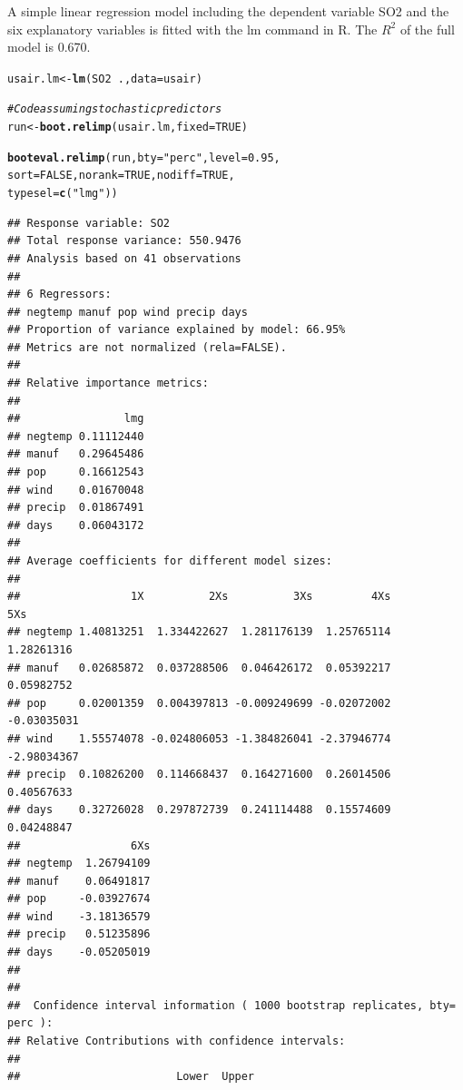 \documentclass[11pt,a4paper,twoside]{book}
\makeatletter
\newcommand{\hlnum}[1]{\textcolor[rgb]{0.686,0.059,0.569}{#1}}%
\newcommand{\hlstr}[1]{\textcolor[rgb]{0.192,0.494,0.8}{#1}}%
\newcommand{\hlcom}[1]{\textcolor[rgb]{0.678,0.584,0.686}{\textit{#1}}}%
\newcommand{\hlopt}[1]{\textcolor[rgb]{0,0,0}{#1}}%
\newcommand{\hlstd}[1]{\textcolor[rgb]{0.345,0.345,0.345}{#1}}%
\newcommand{\hlkwb}[1]{\textcolor[rgb]{0.69,0.353,0.396}{#1}}%
\newcommand{\hlkwc}[1]{\textcolor[rgb]{0.333,0.667,0.333}{#1}}%
\newcommand{\hlkwd}[1]{\textcolor[rgb]{0.737,0.353,0.396}{\textbf{#1}}}%
\newenvironment{kframe}{%
 \def\at@end@of@kframe{}%
 \ifinner\ifhmode%
  \def\at@end@of@kframe{\end{minipage}}%
  \begin{minipage}{\columnwidth}%
 \fi\fi%
 \def\FrameCommand##1{\hskip\@totalleftmargin \hskip-\fboxsep
 \colorbox{shadecolor}{##1}\hskip-\fboxsep
     \hskip-\linewidth \hskip-\@totalleftmargin \hskip\columnwidth}%
 \MakeFramed {\advance\hsize-\width
   \@totalleftmargin\z@ \linewidth\hsize
   \@setminipage}}%
 {\par\unskip\endMakeFramed%
 \at@end@of@kframe}
\newenvironment{knitrout}{}{} %
\makeatother
\begin{document}
A simple linear regression model including the dependent variable SO2 and the six explanatory variables is fitted with the lm command in R. The $R^2$ of the full model is 0.670. 

\begin{knitrout}
\color{fgcolor}\begin{kframe}
\begin{alltt}
\hlstd{usair.lm} \hlkwb{<-} \hlkwd{lm}\hlstd{(SO2}\hlopt{~}\hlstd{.,} \hlkwc{data} \hlstd{= usair)}


\hlcom{#Code assuming stochastic predictors}
\hlstd{run}\hlkwb{<-}\hlkwd{boot.relimp}\hlstd{(usair.lm,} \hlkwc{fixed}\hlstd{=}\hlnum{TRUE}\hlstd{)}

\hlkwd{booteval.relimp}\hlstd{(run,} \hlkwc{bty} \hlstd{=} \hlstr{"perc"}\hlstd{,} \hlkwc{level} \hlstd{=} \hlnum{0.95}\hlstd{,}
                \hlkwc{sort} \hlstd{=} \hlnum{FALSE}\hlstd{,} \hlkwc{norank} \hlstd{=} \hlnum{TRUE}\hlstd{,} \hlkwc{nodiff} \hlstd{=} \hlnum{TRUE}\hlstd{,}
                \hlkwc{typesel} \hlstd{=} \hlkwd{c}\hlstd{(}\hlstr{"lmg"}\hlstd{))}
\end{alltt}
\begin{verbatim}
## Response variable: SO2 
## Total response variance: 550.9476 
## Analysis based on 41 observations 
## 
## 6 Regressors: 
## negtemp manuf pop wind precip days 
## Proportion of variance explained by model: 66.95%
## Metrics are not normalized (rela=FALSE). 
## 
## Relative importance metrics: 
## 
##                lmg
## negtemp 0.11112440
## manuf   0.29645486
## pop     0.16612543
## wind    0.01670048
## precip  0.01867491
## days    0.06043172
## 
## Average coefficients for different model sizes: 
## 
##                 1X          2Xs          3Xs         4Xs         5Xs
## negtemp 1.40813251  1.334422627  1.281176139  1.25765114  1.28261316
## manuf   0.02685872  0.037288506  0.046426172  0.05392217  0.05982752
## pop     0.02001359  0.004397813 -0.009249699 -0.02072002 -0.03035031
## wind    1.55574078 -0.024806053 -1.384826041 -2.37946774 -2.98034367
## precip  0.10826200  0.114668437  0.164271600  0.26014506  0.40567633
## days    0.32726028  0.297872739  0.241114488  0.15574609  0.04248847
##                 6Xs
## negtemp  1.26794109
## manuf    0.06491817
## pop     -0.03927674
## wind    -3.18136579
## precip   0.51235896
## days    -0.05205019
## 
##  
##  Confidence interval information ( 1000 bootstrap replicates, bty= perc ): 
## Relative Contributions with confidence intervals: 
##  
##                        Lower  Upper

\end{verbatim}
\end{kframe}
\end{knitrout}
\end{document}
